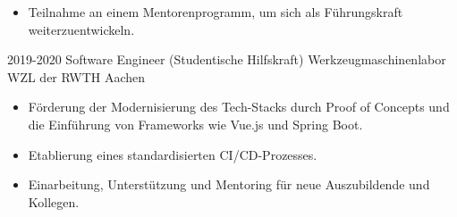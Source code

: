 \documentclass[letterpaper]{twentyonesecondcv} %
\begin{document}
{\begin{twenty}
{\begin{itemize}[leftmargin=5mm,noitemsep,topsep=0pt]
          \item Teilnahme an einem Mentorenprogramm, um sich als Führungskraft weiterzuentwickeln.
        \end{itemize}
        }
      \twentyitem
        {2019-2020}
        {Software Engineer (Studentische Hilfskraft)}
        {\newline Werkzeugmaschinenlabor WZL der RWTH Aachen}
        {
        \vspace{-3mm}
         \begin{itemize}[leftmargin=5mm,noitemsep,topsep=0pt]
          \item Förderung der Modernisierung des Tech-Stacks durch Proof of Concepts und die Einführung von Frameworks wie Vue.js und Spring Boot.
          \item Etablierung eines standardisierten CI/CD-Prozesses.
          \item Einarbeitung, Unterstützung und Mentoring für neue Auszubildende und Kollegen.
        \end{itemize}
        }
    \end{twenty}

}

\clearpage  %
\end{document}
